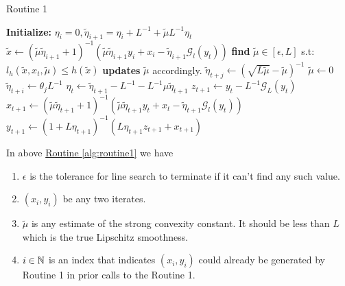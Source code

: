 \documentclass[12pt]{article}
\begin{document}
        \begin{algorithm}
            \caption{Routine 1}\label{alg:routine1}
            \begin{algorithmic}[1]
                    \State \textbf{Initialize: } $\eta_i = 0, \tilde \eta_{i + 1} = \eta_i + L^{-1} + \tilde \mu L^{-1} \eta_t$
                    \State $\tilde x \gets (\tilde \mu\tilde \eta_{i + 1} + 1)^{-1}(\tilde \mu \tilde \eta_{i + 1}y_i + x_i - \tilde \eta_{i + 1}\mathcal G_l(y_t))$
                        \State \textbf{find } $\tilde \mu \in [\epsilon, L]$ s.t: $l_h(\tilde x, x_t, \tilde \mu) \le h(\tilde x)$  
                        \State \textbf{updates} $\tilde \mu$ accordingly. 
                            \State $\tilde \eta_{t + j} \gets (\sqrt{L\tilde \mu} - \tilde \mu)^{-1}$
                        \EndFor
                    \Else {}
                        \State $\tilde \mu \gets 0$
                            \State $\tilde \eta_{t + i} \gets \theta_{j}L^{-1}$
                        \EndFor
                    \EndIf
                        \State $\eta_t \gets \tilde \eta_{t + 1} - L^{-1} - L^{-1}\mu\tilde\eta_{t + 1}$
                        \State $z_{t + 1} \gets y_t - L^{-1}\mathcal G_L(y_t)$
                        \State $x_{t + 1} \gets (\tilde \mu\tilde \eta_{t + 1} + 1)^{-1}(\tilde \mu \tilde \eta_{t + 1}y_t + x_t - \tilde \eta_{t + 1}\mathcal G_l(y_t))$
                        \State $y_{t + 1} \gets (1 + L\eta_{t + 1})^{-1}(L\eta_{t + 1}z_{t + 1} + x_{t + 1})$
                    \EndFor
                \EndProcedure
            \end{algorithmic}
        \end{algorithm}
        In above 
        \hyperref[alg:routine1]
            {Routine \ref*{alg:routine1}}
        we have 
        \begin{enumerate}
            \item $\epsilon$ is the tolerance for line search to terminate if it can't find any such value. 
            \item $(x_i, y_i)$ be any two iterates. 
            \item $\tilde \mu$ is any estimate of the strong convexity constant. It should be less than $L$ which is the true Lipschitz smoothness. 
            \item $i\in \mathbb N$ is an index that indicates $(x_i, y_i)$ could already be generated by Routine 1 in prior calls to the Routine 1. 
        \end{enumerate}
\end{document}
